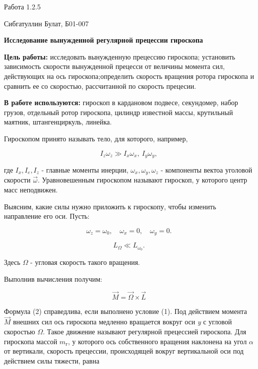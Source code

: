\documentclass[12pt,a4paper]{article}
\begin{document}
\begin{center}
    \large
    Работа 1.2.5
    
    Сибгатуллин Булат, Б01-007
    
    \vspace{0.5cm}
    \textbf{Исследование вынужденной регулярной прецессии гироскопа}

\end{center}

\vspace{0.5cm}
\textbf{Цель работы:} исследовать вынужденную прецессию гироскопа; установить зависимость скорости вынужденной прецесси от величины момента сил, действующих на ось гироскопа;определить скорость вращения ротора гироскопа и сравнить ее со скоростью, рассчитанной по скорость прецесии.

\vspace{0.5cm}
\textbf{В работе используются:} гироскоп в кардановом подвесе, секундомер, набор грузов, отдельный ротор гироскопа, цилиндр известной массы, крутильный маятник, штангенциркуль, линейка.

Гироскопом принято называть тело, для которого, например,

\[I_z\omega_z \gg I_x \omega_x, \: I_y \omega_y,\]

где $I_x, I_e, I_z$ - главные моменты инерции, $\omega_x, \omega_y, \omega_z$ - компоненты вектоа уголовой скорости $\overrightarrow{\omega}$. Уравновешенным гироскопом называют гироскоп, у которого центр масс неподвижен.

Выясним, какие силы нужно приложить к гироскопу, чтобы изменить направление его оси. Пусть:

\[\omega_z = \omega_0, \quad \omega_x = 0, \quad \omega_y = 0.\]

\begin{equation}
L_{\Omega} \ll L_{\omega_0}.
\end{equation}

Здесь $\Omega$ -  угловая скорость такого вращения.

Выполнив вычисления получим:

\begin{equation}
\overrightarrow{M} = \overrightarrow{\Omega} \times \overrightarrow{L}
\end{equation}

Формула (2) справедлива, если выполнено условие (1). Под действием момента $\overrightarrow{M}$ внешних сил ось гироскопа медленно вращается вокруг оси \textit{y} с угловой скоростью $\Omega$. Такое движение называют регулярной прецессией гироскопа. Для гироскопа массой $m_{\textit{г}}$, у которого ось собственного вращения наклонена на угол $\alpha$ от вертикали, скорость прецессии, происходящей вокруг вертикальной оси под действием силы тяжести, равна
\end{document}
